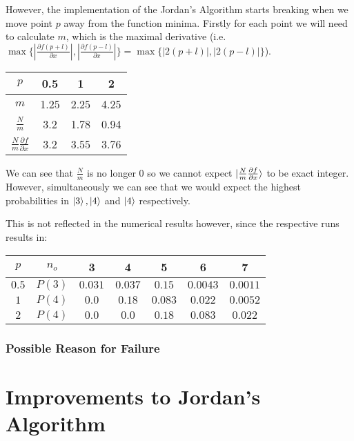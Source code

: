 \documentclass{article}
\begin{document}
However, the implementation of the Jordan's Algorithm starts breaking when we move point $p$ away from the function minima.
Firstly for each point we will need to calculate $m$, which is the maximal derivative
(i.e. $\max \{|\frac{\partial f(p + l)}{\partial x}|, |\frac{\partial f(p - l)}{\partial x}|\} =
\max \{|2(p + l)|, |2(p - l)|\}$).

\begin{table}[h]
    \centering
    \begin{tabular}{|c||c c c|}
        \hline
        $p$ & 0.5 & 1 & 2 \\
        \hline
        $m$ & 1.25 & 2.25 & 4.25 \\
        \hline
        $\frac{N}{m}$ & 3.2 & 1.78 & 0.94 \\
        \hline
        $\frac{N}{m}\frac{\partial f}{\partial x}$ & 3.2 & 3.55 & 3.76 \\
        \hline
    \end{tabular}
\end{table}

We can see that $\frac{N}{m}$ is no longer $0$ so we cannot expect $\ket{\frac{N}{m}\frac{\partial f}{\partial x}}$ to be exact integer.
However, simultaneously we can see that we would expect the highest probabilities in $\ket{3}, \ket{4}$ and $\ket{4}$ respectively.

This is not reflected in the numerical results however, since the respective runs results in:
\begin{table}[h]
    \centering
    \begin{tabular}{|c|c||c c c c c|}
        \hline
        $p$ & $n_o$ & 3 & 4 & 5 & 6 & 7 \\
        \hline
        $0.5$ & $P(3)$ & $0.031$ & $0.037$ & $0.15$ & $0.0043$ & $0.0011$ \\
        \hline
        $1$ & $P(4)$ & $0.0$ & $0.18$ & $0.083$ & $0.022$ & $0.0052$ \\
        \hline
        $2$ & $P(4)$ & $0.0$ & $0.0$ & $0.18$ & $0.083$ & $0.022$ \\
        \hline
    \end{tabular}
\end{table}
\subsubsection{Possible Reason for Failure}

\label{sec:num-results}

\section{Improvements to Jordan's Algorithm}
\end{document}
